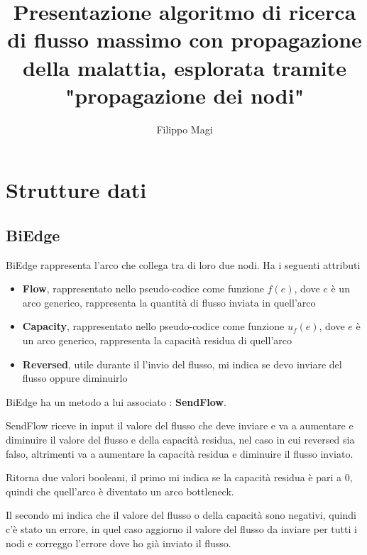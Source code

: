\documentclass{article}
\title{Presentazione algoritmo di ricerca di flusso massimo con propagazione della malattia, esplorata tramite "propagazione dei nodi"}
\author{Filippo Magi }
\begin{document}
\maketitle
\section{Strutture dati}

\subsection{BiEdge}
BiEdge rappresenta l'arco che collega tra di loro due nodi.
Ha i seguenti attributi
\begin{itemize}
    \item \textbf{Flow}, rappresentato nello pseudo-codice come funzione $f(e)$, dove $e$ è un arco generico, rappresenta la quantità di flusso inviata in quell'arco
    \item \textbf{Capacity},  rappresentato nello pseudo-codice come funzione $u_f(e)$, dove $e$ è un arco generico, rappresenta la capacità residua di quell'arco
    \item \textbf{Reversed}, utile durante il l'invio del flusso, mi indica se devo inviare del flusso oppure diminuirlo %
\end{itemize}
BiEdge ha un metodo a lui associato : \textbf{SendFlow}.

SendFlow riceve in input il valore del flusso che deve inviare e va a aumentare e diminuire il valore del flusso e della capacità residua, nel caso in cui reversed sia falso, altrimenti va a aumentare la capacità residua e diminuire il flusso inviato.

Ritorna due valori booleani, il primo mi indica se la capacità residua è pari a 0, quindi che quell'arco è diventato un arco bottleneck.

Il secondo mi indica che il valore del flusso o della capacità sono negativi, quindi c'è stato un errore, in quel caso aggiorno il valore del flusso da inviare per tutti i nodi e correggo l'errore dove ho già inviato il flusso.
\end{document}
